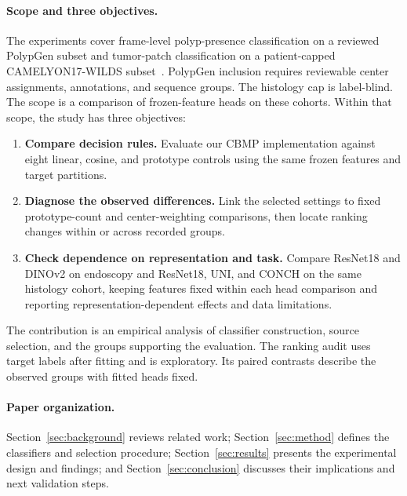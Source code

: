 \paragraph{Scope and three objectives.}
The experiments cover frame-level polyp-presence classification on a reviewed PolypGen subset and tumor-patch classification on a patient-capped CAMELYON17-WILDS subset~\cite{ali2023polypgen,bandi2019camelyon,koh2021wilds}. PolypGen inclusion requires reviewable center assignments, annotations, and sequence groups. The histology cap is label-blind. The scope is a comparison of frozen-feature heads on these cohorts. Within that scope, the study has three objectives:
\begin{enumerate}
    \item \textbf{Compare decision rules.}\label{obj:comparison} Evaluate our CBMP implementation against eight linear, cosine, and prototype controls using the same frozen features and target partitions.
    \item \textbf{Diagnose the observed differences.}\label{obj:mechanism} Link the selected settings to fixed prototype-count and center-weighting comparisons, then locate ranking changes within or across recorded groups.
    \item \textbf{Check dependence on representation and task.}\label{obj:replication} Compare ResNet18 and DINOv2 on endoscopy and ResNet18, UNI, and CONCH on the same histology cohort, keeping features fixed within each head comparison and reporting representation-dependent effects and data limitations.
\end{enumerate}
The contribution is an empirical analysis of classifier construction, source selection, and the groups supporting the evaluation. The ranking audit uses target labels after fitting and is exploratory. Its paired contrasts describe the observed groups with fitted heads fixed.

\paragraph{Paper organization.}
Section~\ref{sec:background} reviews related work; Section~\ref{sec:method} defines the classifiers and selection procedure; Section~\ref{sec:results} presents the experimental design and findings; and Section~\ref{sec:conclusion} discusses their implications and next validation steps.


